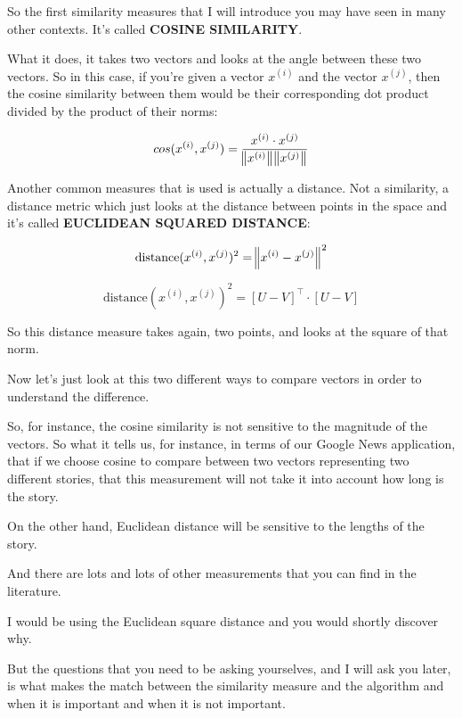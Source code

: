 \documentclass[a4paper, 12pt]{article}
\begin{document}
So the first similarity measures that I will introduce you may have seen in many
other contexts. It's called \textbf{COSINE SIMILARITY}.

What it does, it takes two vectors and looks at the angle between these two
vectors. So in this case, if you're given a vector \(x^{(i)}\) and the vector
\(x^{(j)}\), then the cosine similarity between them would be their
corresponding dot product divided by the product of their norms:

\begin{equation}
cos(x^{(i)}, x^{(j)}) = \frac{x^{(i)} \cdot x^{(j)}}{\norm{x^{(i)}} \norm{x^{(j)}}}
\end{equation}

Another common measures that is used is actually a distance. Not a similarity, a
distance metric which just looks at the distance between points in the space and
it's called \textbf{EUCLIDEAN SQUARED DISTANCE}:

\begin{equation}
\text{distance}(x^{(i)}, x^{(j)})^2 = \norm{x^{(i)} - x^{(j)}}^2
\end{equation}

\begin{equation}
\text{distance}(x^{(i)}, x^{(j)})^2 = [U - V]^\intercal \cdot [U - V]
\end{equation}

So this distance measure takes again, two points, and looks at the square of
that norm.

Now let's just look at this two different ways to compare vectors in order to
understand the difference.

So, for instance, the cosine similarity is not sensitive to the magnitude of the
vectors. So what it tells us, for instance, in terms of our Google News
application, that if we choose cosine to compare between two vectors
representing two different stories, that this measurement will not take it into
account how long is the story.

On the other hand, Euclidean distance will be sensitive to the lengths of the
story.

And there are lots and lots of other measurements that you can find in the
literature.

I would be using the Euclidean square distance and you would shortly discover
why.

But the questions that you need to be asking yourselves, and I will ask you
later, is what makes the match between the similarity measure and the algorithm
and when it is important and when it is not important.
\end{document}
